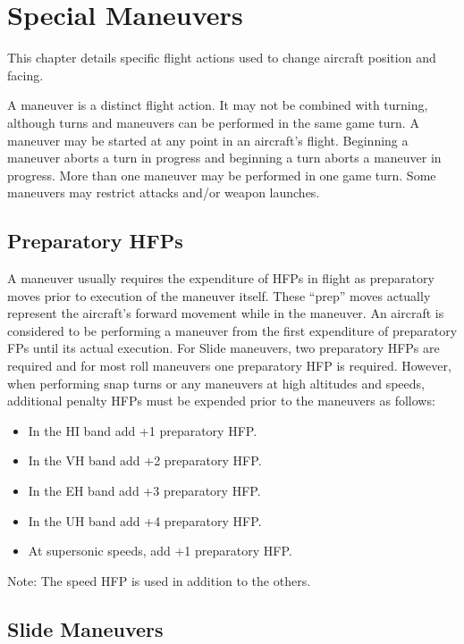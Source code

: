 \section{Special Maneuvers}

This chapter details specific flight actions used to change aircraft position and facing.

A maneuver is a distinct flight action. It may not be combined with turning, although turns and maneuvers can be performed in the same game turn. A maneuver may be started at any point in an aircraft's flight. Beginning a maneuver aborts a turn in progress and beginning a turn aborts a maneuver in progress. More than one maneuver may be performed in one game turn. Some maneuvers may restrict attacks and/or weapon launches.

\subsection{Preparatory HFPs}

A maneuver usually requires the expenditure of HFPs in flight as preparatory moves prior to execution of the maneuver itself. These “prep” moves actually represent the aircraft's forward movement while in the maneuver. An aircraft is considered to be performing a maneuver from the first expenditure of preparatory FPs until its actual execution. For Slide maneuvers, two preparatory HFPs are required and for most roll maneuvers one preparatory HFP is required. However, when performing snap turns or any maneuvers at high altitudes and speeds, additional penalty HFPs must be expended prior to the maneuvers as follows:

\begin{itemize}
    \item In the HI band add +1 preparatory HFP.
    \item In the VH band add +2 preparatory HFP.
    \item In the EH band add +3 preparatory HFP.
    \item In the UH band add +4 preparatory HFP.
    \item At supersonic speeds, add +1 preparatory HFP.
\end{itemize}

Note: The speed HFP is used in addition to the others.

\subsection{Slide Maneuvers}

